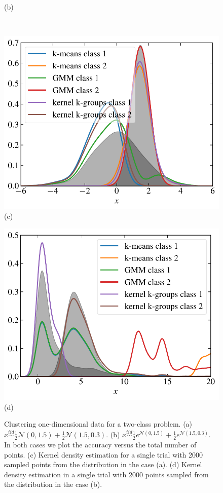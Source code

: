 \documentclass[10pt,journal,compsoc]{IEEEtran}
\begin{document}
\begin{figure}
\begin{minipage}{.4\textwidth}
(b)
\end{minipage}\\[1em]
\begin{minipage}{.37\textwidth}
\includegraphics[width=1\textwidth]{normal_density.pdf}\\[-2em]
(c)
\end{minipage}\hspace{2em}
\begin{minipage}{.37\textwidth}
\includegraphics[width=1\textwidth]{lognormal_density.pdf}\\[-2em]
(d)
\end{minipage}
\caption{
\label{fig:1dexperiment}
Clustering one-dimensional data for a two-class problem.
(a) $x \stackrel{iid}{\sim} \tfrac{1}{2} \mathcal{N}(0, 1.5) +
\tfrac{1}{2}\mathcal{N}(1.5,0.3)$. (b) $x \stackrel{iid}{\sim}
\tfrac{1}{2}e^{\mathcal{N}(0, 1.5)} + \tfrac{1}{2} e^{\mathcal{N}(1.5, 0.3)}$.
In both cases we plot the accuracy versus the total number of points.
(c) Kernel density estimation for a single trial with 2000 sampled
points from the
distribution in the case (a). (d) Kernel density estimation in a single
trial with 
2000 points sampled from the distribution in the case (b).
}
\end{figure}
\end{document}
